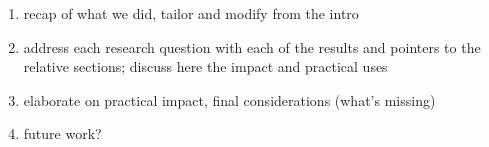 \begin{enumerate}
\item recap of what we did, tailor and modify from the intro
\item address each research question with each of the results and pointers to the relative sections; discuss here the impact and practical uses
\item elaborate on practical impact, final considerations (what's missing) 
\item future work?
\end{enumerate}